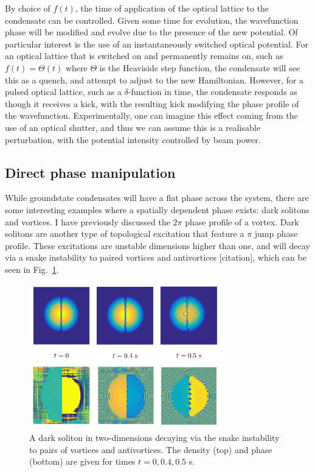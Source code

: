 By choice of $f(t)$, the time of application of the optical lattice to the condensate can be controlled. Given some time for evolution, the wavefunction phase will be modified and evolve due to the presence of the new potential. Of particular interest is the use of an instantaneously switched optical potential. For an optical lattice that is switched on and permanently remains on, such as $f(t) = \Theta(t)$ where $\Theta$ is the Heaviside step function, the condensate will see this as a quench, and attempt to adjust to the new Hamiltonian. However, for a pulsed optical lattice, such as a $\delta$-function in time, the condensate responds as though it receives a kick, with the resulting kick modifying the phase profile of the wavefunction. Experimentally, one can imagine this effect coming from the use of an optical shutter, and thus we can assume this is a realisable perturbation, with the potential intensity controlled by beam power.

\subsection{Direct phase manipulation}\label{sec:phase}
While groundstate condensates will have a flat phase across the system, there are some interesting examples where a spatially dependent phase exists: dark solitons and vortices. I have previously discussed the $2\pi$ phase profile of a vortex. Dark solitons are another type of topological excitation that feature a $\pi$ jump phase profile. These excitations are unstable dimensions higher than one, and will decay via a snake instability to paired vortices and antivortices [citation], which can be seen in Fig.~\ref{fig:solitons}.

\begin{figure}\centering
    \includegraphics[width=0.75\textwidth]{Images/ch4_vtx/solitons.pdf}
    \caption{A dark soliton in two-dimensions decaying via the snake instability to pairs of vortices and antivortices. The density (top) and phase (bottom) are given for times $t=0,0.4,0.5$ s.}\label{fig:solitons}
\end{figure}

